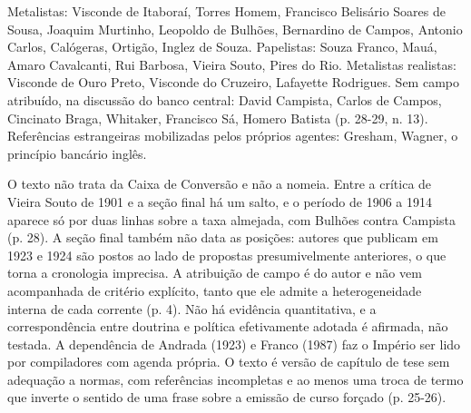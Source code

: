 Metalistas: Visconde de Itaboraí, Torres Homem, Francisco Belisário Soares de
Sousa, Joaquim Murtinho, Leopoldo de Bulhões, Bernardino de Campos, Antonio
Carlos, Calógeras, Ortigão, Inglez de Souza. Papelistas: Souza Franco, Mauá,
Amaro Cavalcanti, Rui Barbosa, Vieira Souto, Pires do Rio. Metalistas
realistas: Visconde de Ouro Preto, Visconde do Cruzeiro, Lafayette Rodrigues.
Sem campo atribuído, na discussão do banco central: David Campista, Carlos de
Campos, Cincinato Braga, Whitaker, Francisco Sá, Homero Batista (p. 28-29,
n. 13). Referências estrangeiras mobilizadas pelos próprios agentes: Gresham,
Wagner, o princípio bancário inglês.

O texto não trata da Caixa de Conversão e não a nomeia. Entre a crítica de
Vieira Souto de 1901 e a seção final há um salto, e o período de 1906 a 1914
aparece só por duas linhas sobre a taxa almejada, com Bulhões contra Campista
(p. 28). A seção final também não data as posições: autores que publicam em
1923 e 1924 são postos ao lado de propostas presumivelmente anteriores, o que
torna a cronologia imprecisa. A atribuição de campo é do autor e não vem
acompanhada de critério explícito, tanto que ele admite a heterogeneidade
interna de cada corrente (p. 4). Não há evidência quantitativa, e a
correspondência entre doutrina e política efetivamente adotada é afirmada, não
testada. A dependência de Andrada (1923) e Franco (1987) faz o Império ser lido
por compiladores com agenda própria. O texto é versão de capítulo de tese sem
adequação a normas, com referências incompletas e ao menos uma troca de termo
que inverte o sentido de uma frase sobre a emissão de curso forçado (p. 25-26).


